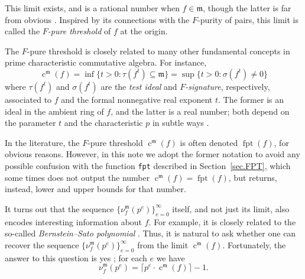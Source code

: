 \documentclass{amsart}
\newcommand{\ft}{\operatorname{c}}
\newcommand{\idealm}{\mathfrak{m}}
\DeclareMathOperator{\fpt}{fpt}
\begin{document}
This limit exists, and is a rational number when $f\in \idealm$, though the latter is far from obvious  \cite{BlickleMustataSmithDiscretenessAndRationalityOfFThresholds}.
Inspired by its connections with the $F$-purity of pairs,  this limit is called the \emph{$F$-pure threshold} of $f$ at the origin.

The $F$-pure threshold is closely related to many other fundamental concepts in prime characteristic commutative algebra.   For instance,
\[ \ft^{\idealm}(f) = \inf \{ t>0 : \tau(f^t)  \subseteq \idealm \} = \sup \{ t>0 : \sigma( f^t) \neq 0 \} \]
where $\tau(f^t)$ and $\sigma(f^t)$ are the \emph{test ideal} and \emph{$F$-signature}, respectively, associated to $f$ and the formal nonnegative real exponent $t$.  The former is an ideal in the ambient ring of $f$, and the latter is a real number;  both depend on the parameter $t$ and the characteristic $p$ in subtle ways \cite{BlickleMustataSmithDiscretenessAndRationalityOfFThresholds, BlickleSchwedeTuckerFSigPairs1}.

In the literature, the $F$-pure threshold $\ft^{\idealm}(f)$ is often denoted $\fpt(f)$, for obvious reasons.
However, in this note we adopt the former notation to avoid any possible confusion with the function \texttt{fpt} described in Section~\ref{sec.FPT}, which some times does not output the number $\ft^{\idealm}(f) = \fpt(f)$, but returns, instead, lower and upper bounds for that number.

It turns out that the sequence $\{ \nu_f^{\idealm}(p^e) \}_{e=0}^{\infty}$ itself, and not just its limit, also encodes interesting information about $f$.  For example, it is closely related to the so-called \emph{Bernstein--Sato polynomial} \cite{MustataTakagiWatanabeFThresholdsAndBernsteinSato}.  Thus, it is natural to ask whether one can recover the sequence $\{ \nu_f^{\idealm}(p^e) \}_{e=0}^{\infty}$ from the limit $\ft^{\idealm}(f)$.  Fortunately, the answer to this question is yes \cite{MustataTakagiWatanabeFThresholdsAndBernsteinSato, HernandezFPurityOfHypersurfaces}; for each $e$ we have
\begin{equation*}
\nu_f^{\idealm}(p^e) = \lceil p^e \cdot \ft^{\idealm}(f) \rceil - 1.
\end{equation*}
\end{document}
